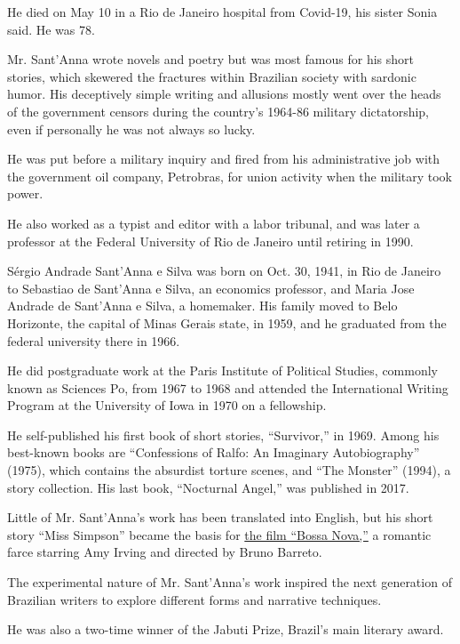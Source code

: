He died on May 10 in a Rio de Janeiro hospital from Covid-19, his sister
Sonia said. He was 78.

Mr. Sant'Anna wrote novels and poetry but was most famous for his short
stories, which skewered the fractures within Brazilian society with
sardonic humor. His deceptively simple writing and allusions mostly went
over the heads of the government censors during the country's 1964-86
military dictatorship, even if personally he was not always so lucky.

He was put before a military inquiry and fired from his administrative
job with the government oil company, Petrobras, for union activity when
the military took power.

He also worked as a typist and editor with a labor tribunal, and was
later a professor at the Federal University of Rio de Janeiro until
retiring in 1990.

Sérgio Andrade Sant'Anna e Silva was born on Oct. 30, 1941, in Rio de
Janeiro to Sebastiao de Sant'Anna e Silva, an economics professor, and
Maria Jose Andrade de Sant'Anna e Silva, a homemaker. His family moved
to Belo Horizonte, the capital of Minas Gerais state, in 1959, and he
graduated from the federal university there in 1966.

He did postgraduate work at the Paris Institute of Political Studies,
commonly known as Sciences Po, from 1967 to 1968 and attended the
International Writing Program at the University of Iowa in 1970 on a
fellowship.

He self-published his first book of short stories, ``Survivor,'' in
1969. Among his best-known books are ``Confessions of Ralfo: An
Imaginary Autobiography'' (1975), which contains the absurdist torture
scenes, and ``The Monster'' (1994), a story collection. His last book,
``Nocturnal Angel,'' was published in 2017.

Little of Mr. Sant'Anna's work has been translated into English, but his
short story ``Miss Simpson'' became the basis for
\href{https://www.nytimes3xbfgragh.onion/2000/04/28/movies/film-review-sleepwalking-to-dreamy-rhythms-in-sumptuous-rio.html}{the
film ``Bossa Nova,''} a romantic farce starring Amy Irving and directed
by Bruno Barreto.

The experimental nature of Mr. Sant'Anna's work inspired the next
generation of Brazilian writers to explore different forms and narrative
techniques.

He was also a two-time winner of the Jabuti Prize, Brazil's main
literary award.

